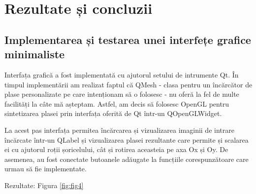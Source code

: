 \documentclass[12pt]{article}
\begin{document}

\section{Rezultate și concluzii}

\subsection{Implementarea și testarea unei interfețe grafice minimaliste}

Interfața grafică a fost implementată cu ajutorul setului de intrumente Qt. În timpul implementării am realizat faptul că QMesh - clasa pentru un încărcător de plase personalizate pe care intenționam să o folosesc - nu oferă la fel de multe facilități la câte mă așteptam. Astfel, am decis să folosesc OpenGL pentru sintetizarea plasei prin interfața oferită de Qt într-un QOpenGLWidget.

La acest pas interfața permitea încărcarea și vizualizarea imaginii de intrare încărcate într-un QLabel și vizualizarea plasei rezultante care permite și scalarea ei cu ajutorul roții șoricelului, cât și rotirea aceasteia pe axa Ox și Oy. De asemenea, au fost conectate butoanele adăugate la funcțiile corespunzătoare care urmau să fie implementate.

Rezultate: Figura \ref{fig:fig4}
\end{document}
